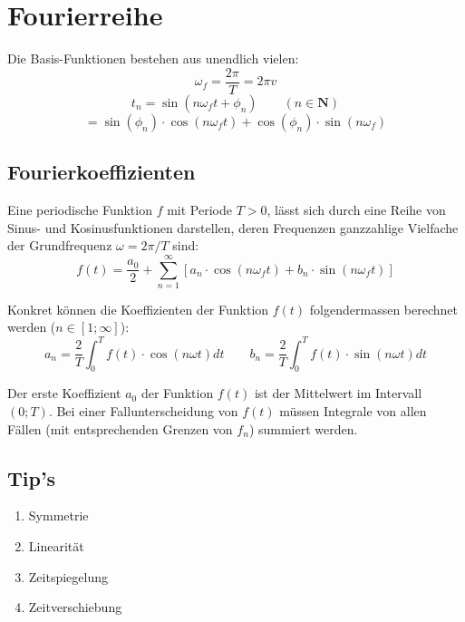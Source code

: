 \section{Fourierreihe}
Die Basis-Funktionen bestehen aus unendlich vielen:
\[\omega_f = \frac{2\pi}{T} = 2\pi v\]
\[
t_n = \sin(n\omega_f t + \phi_n) \qquad (n \in \mathbf{N})
\]
\[
= \sin(\phi_n) \cdot \cos(n\omega_f t) + \cos(\phi_n)\cdot \sin(n\omega_f)
\]

\subsection{Fourierkoeffizienten}
Eine periodische Funktion $f$ mit Periode $T > 0$, lässt sich durch eine Reihe von Sinus- und Kosinusfunktionen darstellen,
deren Frequenzen ganzzahlige Vielfache der Grundfrequenz $\omega = 2\pi/T$ sind:
\[f(t) = \frac{a_0}{2} + \sum_{n = 1}^{\infty}[a_n \cdot \cos(n\omega_ft) + b_n \cdot \sin(n\omega_ft)]\]

\noindent Konkret können die Koeffizienten der Funktion $f(t)$ folgendermassen berechnet werden ($n \in [1;\infty]$):
\[
a_n = \frac{2}{T}\int_{0}^{T}f(t) \cdot \cos(n\omega t)dt \qquad b_n = \frac{2}{T}\int_{0}^{T}f(t) \cdot \sin(n\omega t)dt
\]

\noindent Der erste Koeffizient $a_0$ der Funktion $f(t)$ ist der Mittelwert im Intervall $(0; T)$. Bei einer Fallunterscheidung von $f(t)$ müssen Integrale von allen Fällen (mit entsprechenden Grenzen von $f_n$) summiert werden.


\subsection{Tip's}
\begin{enumerate}[nosep]
	\item Symmetrie
	\item Linearität
	\item Zeitspiegelung
	\item Zeitverschiebung
\end{enumerate}
